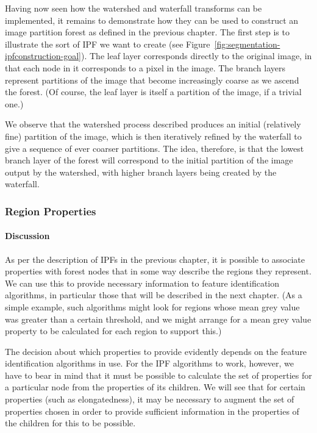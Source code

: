 Having now seen how the watershed and waterfall transforms can be implemented, it remains to demonstrate how they can be used to construct an image partition forest as defined in the previous chapter. The first step is to illustrate the sort of IPF we want to create (see Figure~\ref{fig:segmentation-ipfconstruction-goal}). The leaf layer corresponds directly to the original image, in that each node in it corresponds to a pixel in the image. The branch layers represent partitions of the image that become increasingly coarse as we ascend the forest. (Of course, the leaf layer is itself a partition of the image, if a trivial one.)


We observe that the watershed process described produces an initial (relatively fine) partition of the image, which is then iteratively refined by the waterfall to give a sequence of ever coarser partitions. The idea, therefore, is that the lowest branch layer of the forest will correspond to the initial partition of the image output by the watershed, with higher branch layers being created by the waterfall.

\subsubsection{Region Properties}

\paragraph{Discussion}

As per the description of IPFs in the previous chapter, it is possible to associate properties with forest nodes that in some way describe the regions they represent. We can use this to provide necessary information to feature identification algorithms, in particular those that will be described in the next chapter. (As a simple example, such algorithms might look for regions whose mean grey value was greater than a certain threshold, and we might arrange for a mean grey value property to be calculated for each region to support this.)

The decision about which properties to provide evidently depends on the feature identification algorithms in use. For the IPF algorithms to work, however, we have to bear in mind that it must be possible to calculate the set of properties for a particular node from the properties of its children. We will see that for certain properties (such as elongatedness), it may be necessary to augment the set of properties chosen in order to provide sufficient information in the properties of the children for this to be possible.

